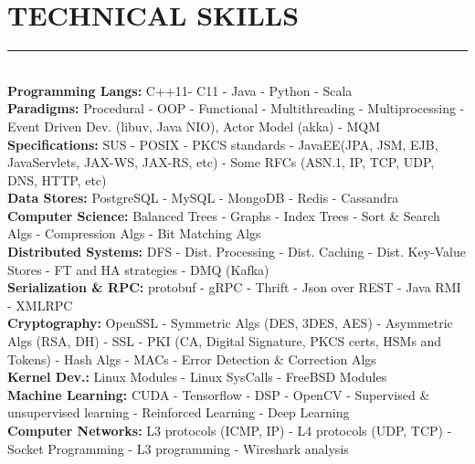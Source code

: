 \documentclass[10pt,a4paper]{article}
\begin{document}
\section{TECHNICAL SKILLS}
\noindent \rule {4.8cm}{0.4pt} \\
\noindent
\textbullet \hspace{0.1cm}\textbf{Programming Langs:} C++11- C11 - Java - Python - Scala \\
\textbullet \hspace{0.1cm}\textbf{Paradigms:} Procedural - OOP - Functional - Multithreading - Multiprocessing - Event Driven Dev. (libuv, Java NIO), Actor Model (akka) - MQM \\
\textbullet \hspace{0.1cm}\textbf{Specifications:} SUS - POSIX - PKCS standards - JavaEE(JPA, JSM, EJB, JavaServlets, JAX-WS, JAX-RS, etc) - Some RFCs (ASN.1, IP, TCP, UDP, DNS, HTTP, etc) \\
\textbullet \hspace{0.1cm}\textbf{Data Stores:} PostgreSQL - MySQL - MongoDB - Redis - Cassandra \\
\textbullet \hspace{0.1cm}\textbf{Computer Science:} Balanced Trees - Graphs - Index Trees - Sort \& Search Algs - Compression Algs - Bit Matching Algs  \\
\textbullet \hspace{0.1cm}\textbf{Distributed Systems:} DFS - Dist. Processing - Dist. Caching - Dist. Key-Value Stores - FT and HA strategies - DMQ (Kafka) \\
\textbullet \hspace{0.1cm}\textbf{Serialization \& RPC:} protobuf - gRPC - Thrift - Json over REST - Java RMI - XMLRPC \\
\textbullet \hspace{0.1cm}\textbf{Cryptography:} OpenSSL - Symmetric Algs (DES, 3DES, AES) - Asymmetric Algs (RSA, DH) - SSL - PKI (CA, Digital Signature, PKCS certs, HSMs and Tokens) - Hash Algs - MACs - Error Detection \& Correction Algs \\ 
\textbullet \hspace{0.1cm}\textbf{Kernel Dev.:} Linux Modules - Linux SysCalls - FreeBSD Modules \\
\textbullet \hspace{0.1cm}\textbf{Machine Learning:} CUDA - Tensorflow - DSP - OpenCV - Supervised \& unsupervised learning - Reinforced Learning - Deep Learning \\
\textbullet \hspace{0.1cm}\textbf{Computer Networks:} L3 protocols (ICMP, IP) - L4 protocols (UDP, TCP) - Socket Programming - L3 programming - Wireshark analysis \\
\end{document}
